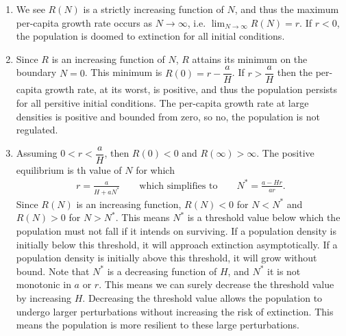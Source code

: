 \documentclass{article} %
\theoremstyle{plain}
\numberwithin{equation}{section} %
\numberwithin{figure}{section} %
\numberwithin{table}{section} %
\begin{document}
\begin{enumerate}[\ \ (a)]
    \item
        We see $R(N)$ is a strictly increasing function of $N$, and thus the maximum per-capita growth rate occurs as $N\rightarrow\infty$, i.e. $\displaystyle\lim_{N\rightarrow \infty}R(N) = r$.  If $r < 0$, the population is doomed to extinction for all initial conditions.
    \item
        Since $R$ is an increasing function of $N$, $R$ attains its minimum on the boundary $N=0$.  This minimum is $R(0) = r - \dfrac{a}{H}$.  If $r > \dfrac{a}{H}$ then the per-capita growth rate, at its worst, is positive, and thus the population persists for all persitive initial conditions.  The per-capita growth rate at large densities is positive and bounded from zero, so no, the population is not regulated.
    \item
        Assuming $0 < r < \dfrac{a}{H}$, then $R(0)<0$ and $R(\infty)>\infty$.  The positive equilibrium is th value of $N$ for which
        \begin{align*}
            r = \frac{a}{H + aN^*} \qquad \text{which simplifies to} \qquad N^* = \frac{a - Hr}{ar}.
        \end{align*}
        Since $R(N)$ is an increasing function, $R(N) < 0$ for $N < N^*$ and $R(N) > 0$ for $N > N^*$.  This means $N^*$ is a threshold value below which the population must not fall if it intends on surviving.  If a population density is initially below this threshold, it will approach extinction asymptotically.  If a population density is initially above this threshold, it will grow without bound.  Note that $N^*$ is a decreasing function of $H$, and $N^*$ it is not monotonic in $a$ or $r$.  This means we can surely decrease the threshold value by increasing $H$.  Decreasing the threshold value allows the population to undergo larger perturbations without increasing the risk of extinction.  This means the population is more resilient to these large perturbations.
\end{enumerate}
\end{document}
